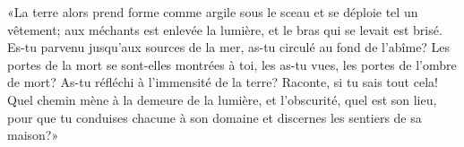 «La terre alors prend forme comme argile sous le sceau et se déploie tel un vêtement;
	aux méchants est enlevée la lumière, et le bras qui se levait est brisé.
Es-tu parvenu jusqu’aux sources de la mer, as-tu circulé au fond de l’abîme?
Les portes de la mort se sont-elles montrées à toi,
	les as-tu vues, les portes de l’ombre de mort?
As-tu réfléchi à l’immensité de la terre?
Raconte, si tu sais tout cela!
Quel chemin mène à la demeure de la lumière, et l’obscurité, quel est son lieu,
	pour que tu conduises chacune à son domaine et discernes les sentiers de sa maison?»